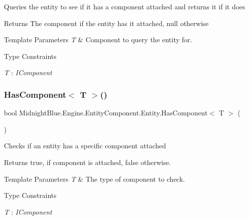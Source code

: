 Queries the entity to see if it has a component attached and returns it if it does 

\begin{DoxyReturn}{Returns}
The component if the entity has it attached, null otherwise
\end{DoxyReturn}

\begin{DoxyTemplParams}{Template Parameters}
{\em T} & Component to query the entity for.\\
\hline
\end{DoxyTemplParams}
\begin{Desc}
\item[Type Constraints]\begin{description}
\item[{\em T} : {\em I\+Component}]\end{description}
\end{Desc}
\hypertarget{class_midnight_blue_1_1_engine_1_1_entity_component_1_1_entity_a3ee2ffd693e66d08f623cb0b4279306f}{}\label{class_midnight_blue_1_1_engine_1_1_entity_component_1_1_entity_a3ee2ffd693e66d08f623cb0b4279306f} 
\subsubsection{\texorpdfstring{Has\+Component$<$ T $>$()}{HasComponent< T >()}}
{\footnotesize\ttfamily bool Midnight\+Blue.\+Engine.\+Entity\+Component.\+Entity.\+Has\+Component$<$ T $>$ (\begin{DoxyParamCaption}{ }\end{DoxyParamCaption})\hspace{0.3cm}{\ttfamily [inline]}}



Checks if an entity has a specific component attached 

\begin{DoxyReturn}{Returns}
{\ttfamily true}, if component is attached, {\ttfamily false} otherwise.
\end{DoxyReturn}

\begin{DoxyTemplParams}{Template Parameters}
{\em T} & The type of component to check.\\
\hline
\end{DoxyTemplParams}
\begin{Desc}
\item[Type Constraints]\begin{description}
\item[{\em T} : {\em I\+Component}]\end{description}
\end{Desc}


